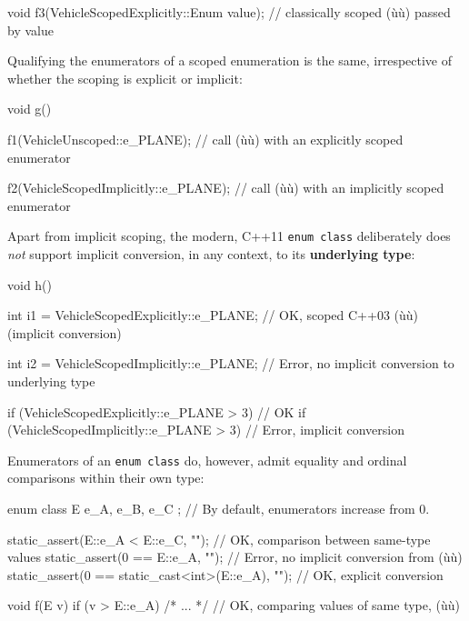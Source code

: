 \begin{emcppslisting}[emcppsbatch=e3,basicstyle={\ttfamily\footnotesize}]
void f3(VehicleScopedExplicitly::Enum value);
    // classically scoped (ù{}ù) passed by value
\end{emcppslisting}

\noindent Qualifying the enumerators of a scoped enumeration is the same,
irrespective of whether the scoping is explicit or implicit:

\begin{emcppslisting}[emcppsbatch=e3]
void g()
{
    f1(VehicleUnscoped::e_PLANE);
        // call (ù{}ù) with an explicitly scoped enumerator

    f2(VehicleScopedImplicitly::e_PLANE);
        // call (ù{}ù) with an implicitly scoped enumerator
}
\end{emcppslisting}

\noindent Apart from implicit scoping, the modern, C++11
\texttt{enum}~\texttt{class} deliberately does \emph{not} support
implicit conversion, in any context, to its \textbf{underlying type}:

\begin{emcppslisting}[emcppsbatch=e3]
void h()
{
    int i1 = VehicleScopedExplicitly::e_PLANE;
       // OK, scoped C++03 (ù{}ù) (implicit conversion)
 
    int i2 = VehicleScopedImplicitly::e_PLANE;
        // Error, no implicit conversion to underlying type

    if (VehicleScopedExplicitly::e_PLANE > 3) {} // OK
    if (VehicleScopedImplicitly::e_PLANE > 3) {} // Error, implicit conversion
}
\end{emcppslisting}

\noindent Enumerators of an \texttt{enum}~\texttt{class} do, however, admit
equality and ordinal comparisons within their own type:

\begin{emcppslisting}[emcppsbatch=e4]
enum class E { e_A, e_B, e_C };  // By default, enumerators increase from 0.

static_assert(E::e_A < E::e_C, "");  // OK, comparison between same-type values
static_assert(0 == E::e_A, "");      // Error, no implicit conversion from (ù{}ù)
static_assert(0 == static_cast<int>(E::e_A), "");  // OK, explicit conversion

void f(E v)
{
    if (v > E::e_A) { /* ... */ }  // OK, comparing values of same type, (ù{}ù)
}
\end{emcppslisting}

